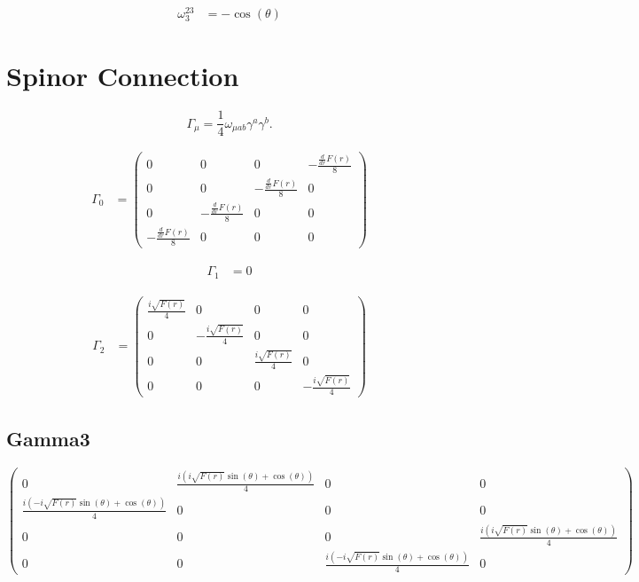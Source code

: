 \documentclass[12pt,fleqn]{article}
\begin{document}
\[
\begin{aligned}
\omega_{3}^{23} &= - \cos{\left(\theta \right)}
\end{aligned}
\]

\section*{Spinor Connection}

\[
\Gamma_\mu
=
\frac{1}{4}
\omega_{\mu ab}
\gamma^a\gamma^b .
\]

\[
\begin{aligned}
\Gamma_{0} &=
\begin{pmatrix}
0 & 0 & 0 & - \frac{\frac{d}{d r} F{\left(r \right)}}{8} \\
0 & 0 & - \frac{\frac{d}{d r} F{\left(r \right)}}{8} & 0 \\
0 & - \frac{\frac{d}{d r} F{\left(r \right)}}{8} & 0 & 0 \\
- \frac{\frac{d}{d r} F{\left(r \right)}}{8} & 0 & 0 & 0
\end{pmatrix}
\end{aligned}
\]

\[
\begin{aligned}
\Gamma_{1} &= 0
\end{aligned}
\]

\[
\begin{aligned}
\Gamma_{2} &=
\begin{pmatrix}
\frac{i \sqrt{F{\left(r \right)}}}{4} & 0 & 0 & 0 \\
0 & - \frac{i \sqrt{F{\left(r \right)}}}{4} & 0 & 0 \\
0 & 0 & \frac{i \sqrt{F{\left(r \right)}}}{4} & 0 \\
0 & 0 & 0 & - \frac{i \sqrt{F{\left(r \right)}}}{4}
\end{pmatrix}
\end{aligned}
\]

\clearpage
\begin{landscape}
\section*{Gamma{3}}

\[
\begin{pmatrix}
0 & \frac{i \left(i \sqrt{F{\left(r \right)}} \sin{\left(\theta \right)} + \cos{\left(\theta \right)}\right)}{4} & 0 & 0 \\
\frac{i \left(- i \sqrt{F{\left(r \right)}} \sin{\left(\theta \right)} + \cos{\left(\theta \right)}\right)}{4} & 0 & 0 & 0 \\
0 & 0 & 0 & \frac{i \left(i \sqrt{F{\left(r \right)}} \sin{\left(\theta \right)} + \cos{\left(\theta \right)}\right)}{4} \\
0 & 0 & \frac{i \left(- i \sqrt{F{\left(r \right)}} \sin{\left(\theta \right)} + \cos{\left(\theta \right)}\right)}{4} & 0
\end{pmatrix}
\]

\end{landscape}
\clearpage
\end{document}
